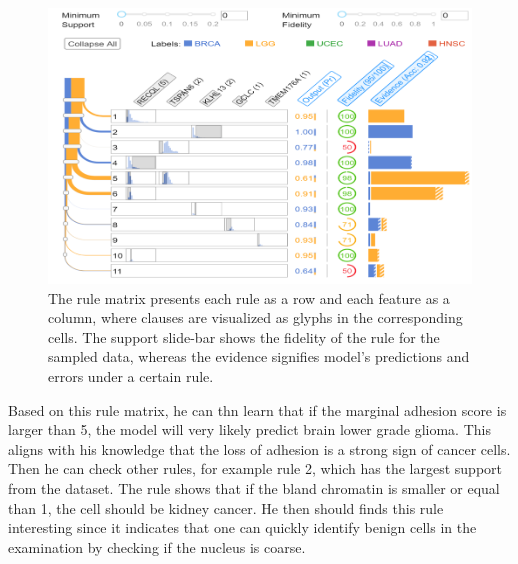 \begin{figure}
	\centering
	\captionsetup{justification=centering}
		\includegraphics[scale=1.3]{images/decision_rules_explain.png}
	    \caption[Visualization of rules using rule matrix.]{The rule matrix presents each rule as a row and each feature as a column, where clauses are visualized as glyphs in the corresponding cells. The support slide-bar shows the fidelity of the rule for the sampled data, whereas the evidence signifies model's predictions and errors under a certain rule.}
	    \label{fig:decision_rules_explain}
\end{figure}

\hspace*{3.5mm} Based on this rule matrix, he can thn learn that if the marginal adhesion score is larger than 5, the model will very likely predict brain lower grade glioma. This aligns with his knowledge that the loss of adhesion is a strong sign of cancer cells. Then he can check other rules, for example rule 2, which has the largest support from the dataset. The rule shows that if the bland chromatin is smaller or equal than 1, the cell should be kidney cancer. He then should finds this rule interesting since it indicates that one can quickly identify benign cells in the examination by checking if the nucleus is coarse. 

